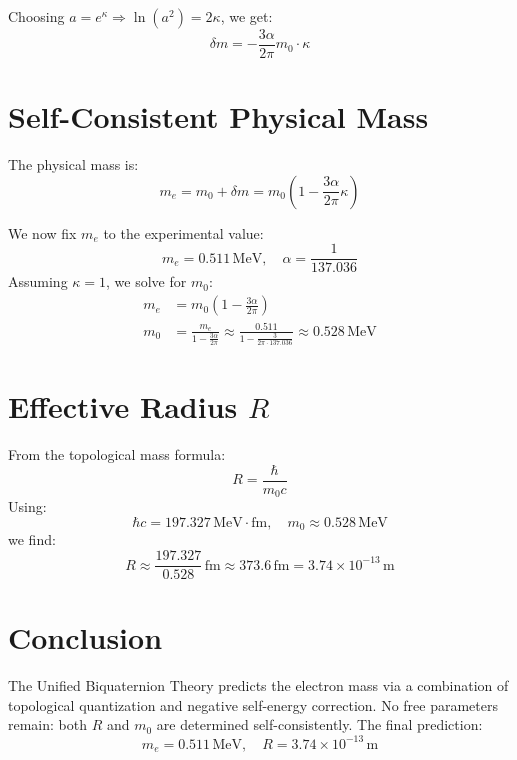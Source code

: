 \documentclass[12pt, a4paper]{article}
\begin{document}
Choosing \( a = e^\kappa \Rightarrow \ln(a^2) = 2\kappa \), we get:
\begin{equation}
    \delta m = -\frac{3\alpha}{2\pi} m_0 \cdot \kappa
\end{equation}

\section{Self-Consistent Physical Mass}

The physical mass is:
\begin{equation}
    m_e = m_0 + \delta m = m_0 \left( 1 - \frac{3\alpha}{2\pi} \kappa \right)
\end{equation}

We now fix \( m_e \) to the experimental value:
\[
m_e = 0.511\,\mathrm{MeV}, \quad \alpha = \frac{1}{137.036}
\]
Assuming \( \kappa = 1 \), we solve for \( m_0 \):
\begin{align*}
    m_e &= m_0 \left( 1 - \frac{3\alpha}{2\pi} \right) \\
    m_0 &= \frac{m_e}{1 - \frac{3\alpha}{2\pi}} \approx \frac{0.511}{1 - \frac{3}{2\pi \cdot 137.036}} \approx 0.528\,\mathrm{MeV}
\end{align*}

\section{Effective Radius \( R \)}

From the topological mass formula:
\begin{equation}
    R = \frac{\hbar}{m_0 c}
\end{equation}
Using:
\[
\hbar c = 197.327\,\mathrm{MeV \cdot fm}, \quad m_0 \approx 0.528\,\mathrm{MeV}
\]
we find:
\begin{equation}
    R \approx \frac{197.327}{0.528} \,\mathrm{fm} \approx 373.6\,\mathrm{fm} = 3.74 \times 10^{-13} \,\mathrm{m}
\end{equation}

\section{Conclusion}

The Unified Biquaternion Theory predicts the electron mass via a combination of topological quantization and negative self-energy correction. No free parameters remain: both \( R \) and \( m_0 \) are determined self-consistently. The final prediction:
\[
\boxed{
m_e = 0.511\,\mathrm{MeV}, \quad R = 3.74 \times 10^{-13}\,\mathrm{m}
}
\]
\end{document}
